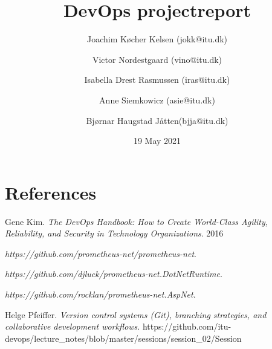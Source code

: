 \documentclass{article}
\title{DevOps projectreport}
\author{Joachim Køcher Kelsen (jokk@itu.dk) \and Victor Nordestgaard (vino@itu.dk) \and Isabella Drest Rasmussen (iras@itu.dk) \and Anne Siemkowicz (asie@itu.dk) \and Bjørnar Haugstad Jåtten(bjja@itu.dk)}
\date{19 May 2021}
\begin{document}
{}

\maketitle

\newpage

\tableofcontents

\newpage



\newpage



\newpage



\newpage



\newpage

\section{References}

\begin{thebibliography}{9}
Gene Kim.
\textit{The DevOps Handbook: How to Create World-Class Agility, Reliability, and Security in Technology Organizations}. 
2016

\textit{https://github.com/prometheus-net/prometheus-net}.

\textit{https://github.com/djluck/prometheus-net.DotNetRuntime}.

\textit{https://github.com/rocklan/prometheus-net.AspNet}.

Helge Pfeiffer. 
\textit{Version control systems (Git), branching strategies, and collaborative development workflows}. https://github.com/itu-devops/lecture_notes/blob/master/sessions/session_02/Session%

\end{thebibliography}
\end{document}
